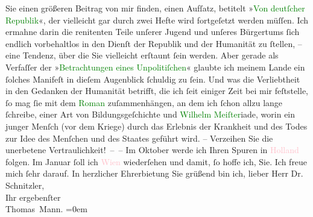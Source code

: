                Sie einen größeren Beitrag von mir finden, einen Aufſatz, betitelt »\textcolor{green}{Von deutſcher Republik}{}\ledrightnote{\textcolor{green}{Von deutscher Republik. Gerhart Hauptmann zum sechzigsten Geburtstag}}«, der vielleicht gar durch zwei Hefte wird
               fortgeſetzt werden müſſen. Ich ermahne darin die renitenten Teile unſerer Jugend und
               unſeres Bürgertums ſich endlich vorbehaltlos in den Dienſt der Republik und der
               Humanität zu ſtellen, – eine Tendenz, über die Sie vielleicht erſtaunt ſein werden.
               Aber gerade als Verfaſſer der »\textcolor{green}{Betrachtungen eines
                  Unpolitiſchen}{}\ledrightnote{\textcolor{green}{Betrachtungen eines Unpolitischen}}« glaubte ich meinem Lande ein ſolches Manifeſt in dieſem
               Augenblick ſchuldig zu ſein. Und was die Verliebtheit in den Gedanken der Humanität
               betrifft, die ich ſeit einiger Zeit bei mir feſtstelle, ſo mag ſie mit dem \textcolor{green}{Roman}{} zuſammenhängen, an dem ich
               ſchon {\pb}allzu lange ſchreibe, einer Art von
               Bildungsgeſchichte und \textcolor{green}{Wilhelm
                  Meiſter}{}iade, worin ein junger Menſch (vor dem Kriege) durch das Erlebnis der
               Krankheit und des Todes zur Idee des Menſchen und des Staates geführt wird. –
               Verzeihen Sie die unerbetene Vertraulichkeit! – –\pend
           \pstart
           Im Oktober werde ich Ihren Spuren in \textcolor{pink}{Holland}{}\ledrightnote{\textcolor{pink}{Niederlande}} folgen. Im Januar{ }ſoll ich \textcolor{pink}{Wien}{}\ledrightnote{\textcolor{pink}{Wien}}
               wiederſehen und damit, ſo hoffe ich, Sie. Ich freue mich ſehr darauf.\pend
           \pstart
           In herzlicher Ehrerbietung Sie grüßend bin ich, lieber Herr Dr.
               Schnitzler,{\\[\baselineskip]}Ihr ergebenſter{\\[\baselineskip]}\spacefill\mbox{Thomas Mann.}\pend
           \leftskip=0em{}\endnumbering{}  
      